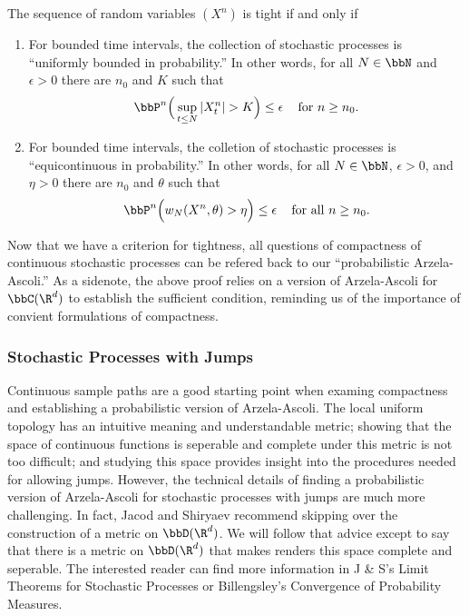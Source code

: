\documentclass{report}
\begin{document}
\begin{theorem}
The sequence of random variables $(X^n)$ is tight if and only if
\begin{enumerate}
\item For bounded time intervals, the collection of stochastic
processes is ``uniformly bounded in probability.''  In other words,
for all $N \in \bbN$ and $\epsilon > 0$ there are $n_0$ and $K$ such
that
\[
\bbP^n \Big(\sup_{t \leq N} |X_t^n| > K \Big) \leq \epsilon \;\;\;
\textmd{ for } n \geq n_0.
\]
\item For bounded time intervals, the colletion of stochastic
processes is ``equicontinuous in probability.'' In other words, for
all $N \in \bbN$, $\epsilon > 0$, and $\eta > 0$ there are $n_0$ and
$\theta$ such that
\[
\bbP^n \Big( w_N(X^n,\theta) > \eta \Big) \leq \epsilon \;\;\;
\textmd{ for all } n \geq n_0.
\]
\end{enumerate}
\end{theorem}

Now that we have a criterion for tightness, all questions of
compactness of continuous stochastic processes can be refered back to
our ``probabilistic Arzela-Ascoli.''  As a sidenote, the above proof
relies on a version of Arzela-Ascoli for $\bbC(\R^d)$ to establish the
sufficient condition, reminding us of the importance of convient
formulations of compactness.

\subsubsection{Stochastic Processes with Jumps}

Continuous sample paths are a good starting point when examing
compactness and establishing a probabilistic version of Arzela-Ascoli. 
The local uniform topology has an intuitive meaning and understandable
metric; showing that the space of continuous functions is seperable
and complete under this metric is not too difficult; and studying this
space provides insight into the procedures needed for allowing jumps. 
However, the technical details of finding a probabilistic version of
Arzela-Ascoli for stochastic processes with jumps are much more
challenging.  In fact, Jacod and Shiryaev recommend skipping over the
construction of a metric on $\bbD(\R^d)$.  We will follow that advice
except to say that there is a metric on $\bbD(\R^d)$ that makes
renders this space complete and seperable.  The interested reader can
find more information in J \& S's Limit Theorems for Stochastic
Processes or Billengsley's Convergence of Probability Measures.
\end{document}
